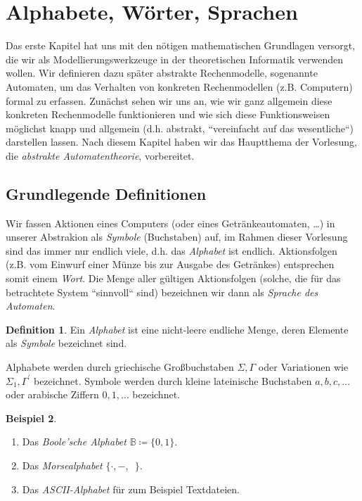 \documentclass[11pt, a4paper]{article}
\theoremstyle{definition}
\newtheorem{definition}{Definition}[section]
\newtheorem{example}[definition]{Beispiel}
\theoremstyle{plain}
\numberwithin{equation}{section}
\begin{document}
\newpage
\section{Alphabete, Wörter, Sprachen}\label{sec:awl}
Das erste Kapitel hat uns mit den nötigen mathematischen Grundlagen versorgt, die wir als Modellierungswerkzeuge in der theoretischen Informatik verwenden wollen. Wir definieren dazu später abstrakte Rechenmodelle, sogenannte Automaten, um das Verhalten von konkreten Rechenmodellen (z.B. Computern) formal zu erfassen. Zunächst sehen wir uns an, wie wir ganz allgemein diese konkreten Rechenmodelle funktionieren und wie sich diese Funktionsweisen möglichst knapp und allgemein (d.h. abstrakt, ``vereinfacht auf das wesentliche``) darstellen lassen. Nach diesem Kapitel haben wir das Hauptthema der Vorlesung, die \textit{abstrakte Automatentheorie}, vorbereitet.

\subsection{Grundlegende Definitionen}\label{sec:awl_def}
Wir fassen Aktionen eines Computers (oder eines Getränkeautomaten, \ldots) in unserer Abstrakion als \textit{Symbole} (Buchstaben) auf, im Rahmen dieser Vorlesung sind das immer nur endlich viele, d.h. das \textit{Alphabet} ist endlich. Aktionsfolgen (z.B. vom Einwurf einer Münze bis zur Ausgabe des Getränkes) entsprechen somit einem \textit{Wort}. Die Menge aller gültigen Aktionsfolgen (solche, die für das betrachtete System ``sinnvoll`` sind) bezeichnen wir dann als \textit{Sprache des Automaten}.
\begin{definition}
	Ein \textit{Alphabet} ist eine nicht-leere endliche Menge, deren Elemente als \textit{Symbole} bezeichnet sind.
\end{definition}
Alphabete werden durch griechische Großbuchstaben $\Sigma, \Gamma$ oder Variationen wie $\Sigma_1, \Gamma^\prime$ bezeichnet. Symbole werden durch kleine lateinische Buchstaben $a, b, c, \ldots$ oder arabische Ziffern $0, 1, \ldots$ bezeichnet.
\begin{example}
	\
	\begin{enumerate}
		\item Das \textit{Boole'sche Alphabet} $\mathbb{B} \coloneqq \{ 0, 1 \}$.
		\item Das \textit{Morsealphabet} $\{ \cdot, -, \,\,\, \}$.
		\item Das \textit{ASCII-Alphabet} für zum Beispiel Textdateien.
	\end{enumerate}
\end{example}
\end{document}
